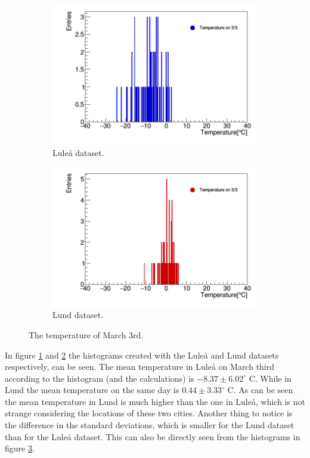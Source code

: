 \documentclass[a4paper,12pt,twoside]{article}
\begin{document}
\begin{figure}[H]
\centering
\begin{subfigure}{.5\textwidth}
  \centering
  \includegraphics[width=1.0\linewidth]{Lulea.png}
  \caption{Luleå dataset.}
  \label{fig:Lulea}
\end{subfigure}%
\begin{subfigure}{.5\textwidth}
  \centering
  \includegraphics[width=1.0\linewidth]{Lund.png}
  \caption{Lund dataset.}
  \label{fig:Lund}
\end{subfigure}
\caption{The temperature of March 3rd.}
\label{fig:histos}
\end{figure}

\noindent In figure \ref{fig:Lulea} and \ref{fig:Lund} the histograms created with the Luleå and Lund datasets respectively, can be seen. The mean temperature in Luleå on March third according to the histogram (and the calculations) is $-8.37 \pm 6.02 ^\circ$ C. While in Lund the mean temperature on the same day is $0.44 \pm 3.33 ^\circ$ C. As can be seen the mean 
temperature in Lund is much higher than the one in Luleå, which is not strange considering the locations of these two cities. Another thing to notice is the difference in the standard deviations, which is smaller for the Lund dataset than for the Luleå dataset. This can also be directly seen from the histograms in figure \ref{fig:histos}. 
\end{document}
